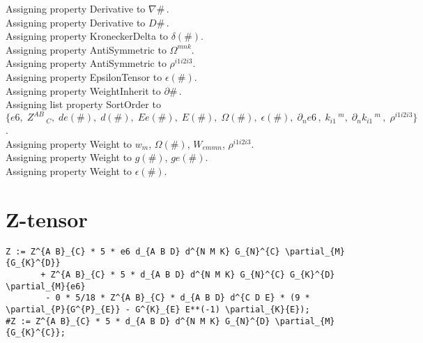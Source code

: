 \documentclass[11pt]{article}
\begin{document}
Assigning property Derivative to $\nabla{\#}\, $.
\\
Assigning property Derivative to $D{\#}\, $.
\\
Assigning property KroneckerDelta to $\delta(\#)$.
\\
Assigning property AntiSymmetric to ${\Omega}^{m n k}$.
\\
Assigning property AntiSymmetric to ${\rho}^{i1 i2 i3}$.
\\
Assigning property EpsilonTensor to $\epsilon(\#)$.
\\
Assigning property WeightInherit to $\partial{\#}\, $.
\\
Assigning list property SortOrder to $\{e6,\; {Z}^{A B}\,_{C},\; de(\#),\; d(\#),\; Ee(\#),\; E(\#),\; \Omega(\#),\; \epsilon(\#),\; {\partial}_{n}{e6}\, ,\; {k}_{i1}\,^{m},\; {\partial}_{n}{{k}_{i1}\,^{m}}\, ,\; {\rho}^{i1 i2 i3}\}$.
\\
Assigning property Weight to ${w}_{m}$, $\Omega(\#)$, ${W}_{em m n}$, ${\rho}^{i1 i2 i3}$.
\\
Assigning property Weight to $g(\#)$, $ge(\#)$.
\\
Assigning property Weight to $\epsilon(\#)$.
\\
\section*{Z-tensor}
{\color[named]{Blue}\begin{verbatim}
Z := Z^{A B}_{C} * 5 * e6 d_{A B D} d^{N M K} G_{N}^{C} \partial_{M}{G_{K}^{D}} 
       + Z^{A B}_{C} * 5 * d_{A B D} d^{N M K} G_{N}^{C} G_{K}^{D} \partial_{M}{e6} 
        - 0 * 5/18 * Z^{A B}_{C} * d_{A B D} d^{C D E} * (9 * \partial_{P}{G^{P}_{E}} - G^{K}_{E} E**(-1) \partial_{K}{E});
#Z := Z^{A B}_{C} * 5 * d_{A B D} d^{N M K} G_{N}^{D} \partial_{M}{G_{K}^{C}};
\end{verbatim}}
\end{document}
